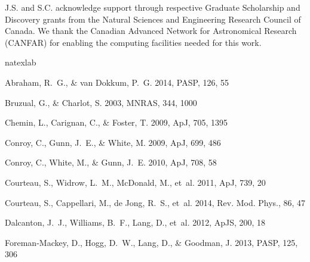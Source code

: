 \documentclass{iau}
\newcommand{\apj}{ApJ}           %
\newcommand{\mnras}{MNRAS}       %
\newcommand{\pasp}{PASP}
\newcommand{\apjs}{ApJS}           %
\begin{document}
\noindent J.S. and S.C. acknowledge support through respective Graduate Scholarship and Discovery grants from the Natural Sciences and Engineering Research Council of Canada. We thank the Canadian Advanced Network for Astronomical Research (CANFAR) for enabling the computing facilities needed for this work.

% 

\begin{thebibliography}{19}
\expandafter\ifx\csname natexlab\endcsname\relax\def\natexlab#1{#1}\fi

{Abraham}, R.~G., \& {van Dokkum}, P.~G. 2014, \pasp, 126, 55

{Bruzual}, G., \& {Charlot}, S. 2003, \mnras, 344, 1000

{Chemin}, L., {Carignan}, C., \& {Foster}, T. 2009, \apj, 705, 1395

{Conroy}, C., {Gunn}, J.~E., \& {White}, M. 2009, \apj, 699, 486

{Conroy}, C., {White}, M., \& {Gunn}, J.~E. 2010, \apj, 708, 58

{Courteau}, S., {Widrow}, L.~M., {McDonald}, M., {et~al.} 2011, \apj, 739, 20

{Courteau}, S., {Cappellari}, M., {de Jong}, R.~S., {et~al.} 2014, Rev. Mod.
  Phys., 86, 47

{Dalcanton}, J.~J., {Williams}, B.~F., {Lang}, D., {et~al.} 2012, \apjs, 200,
  18

{Foreman-Mackey}, D., {Hogg}, D.~W., {Lang}, D., \& {Goodman}, J. 2013, \pasp,
  125, 306


\end{thebibliography}
\end{document}
